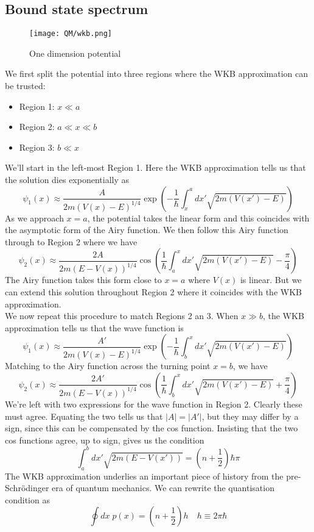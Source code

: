 \documentclass[cyan]{elegantnote}
\begin{document}
\subsection{Bound state spectrum}
\begin{figure}[!h]
	\centering
	\texttt{[image: QM/wkb.png]}
	\caption{One dimension potential}
\end{figure}
\noindent
We first split the potential into three regions where the WKB approximation can be trusted:
\begin{itemize}
\item Region 1: $x \ll a$
\item Region 2: $a \ll x \ll b$
\item Region 3: $b \ll x$
\end{itemize}
We'll start in the left-most Region 1. Here the WKB
approximation tells us that the solution dies exponentially as
\[\psi_1(x) \approx \frac{A}{2m(V(x) - E)^{1/4}} \exp \left( -\frac{1}{\hbar} \int_{x}^a dx' \sqrt{2m(V(x')-E)} \right)\]
As we approach $x = a$, the potential takes the linear form and this coincides with the asymptotic form of the Airy function. We then follow this Airy function through to Region 2 where we have
\[\psi_2(x) \approx \frac{2A}{2m(E - V(x))^{1/4}} \cos \left( \frac{1}{\hbar} \int_{a}^x dx' \sqrt{2m(V(x')-E)} - \frac{\pi}{4} \right)\]
The Airy function takes this form close to $x = a$ where $V(x)$ is linear. But we can extend this solution throughout Region 2 where it coincides with the WKB approximation.
\\
We now repeat this procedure to match Regions 2 an 3. When $x \gg b$, the WKB approximation tells us that the wave function is
\[\psi_1(x) \approx \frac{A'}{2m(V(x) - E)^{1/4}} \exp \left( -\frac{1}{\hbar} \int_{b}^x dx' \sqrt{2m(V(x')-E)} \right)\]
Matching to the Airy function across the turning point $x = b$, we have
\[\psi_2(x) \approx \frac{2A'}{2m(E - V(x))^{1/4}} \cos \left( \frac{1}{\hbar} \int_{b}^x dx' \sqrt{2m(V(x')-E)} + \frac{\pi}{4} \right)\]
We're left with two expressions for the wave function in Region 2.
Clearly these must agree. Equating the two tells us that $|A| = |A'|$, but they may differ by a sign, since this can be compensated by the cos function. Insisting that the two cos functions agree, up to sign, gives us the condition
\[\int_a^b dx' \sqrt{2m(E-V(x'))} = \left( n + \frac{1}{2} \right) \hbar \pi\]
The WKB approximation underlies an important piece of history from the pre-Schrödinger era of quantum mechanics. 
We can rewrite the quantisation condition as
\[\oint dx \; p(x) = \left( n + \frac{1}{2} \right) h \quad h \equiv 2\pi \hbar \]
\end{document}
